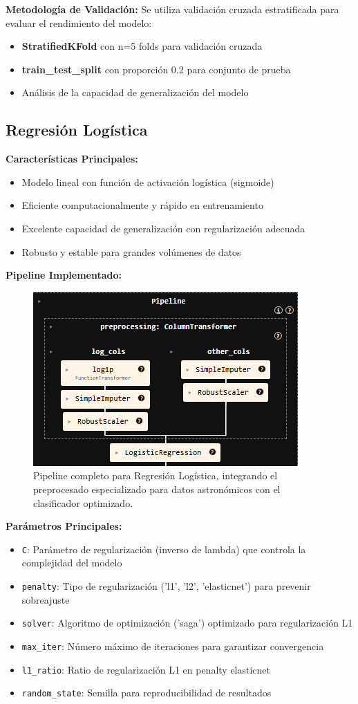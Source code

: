 \documentclass{article}
\begin{document}
\textbf{Metodología de Validación:}
Se utiliza validación cruzada estratificada para evaluar el rendimiento del modelo:
\begin{itemize}
    \item \textbf{StratifiedKFold} con n=5 folds para validación cruzada
    \item \textbf{train\_test\_split} con proporción 0.2 para conjunto de prueba
    \item Análisis de la capacidad de generalización del modelo
\end{itemize}

\subsection{Regresión Logística}

\textbf{Características Principales:}
\begin{itemize}
    \item Modelo lineal con función de activación logística (sigmoide)
    \item Eficiente computacionalmente y rápido en entrenamiento
    \item Excelente capacidad de generalización con regularización adecuada
    \item Robusto y estable para grandes volúmenes de datos
\end{itemize}

\textbf{Pipeline Implementado:}
\begin{figure}[H]
    \centering
    \includegraphics[width=0.4\linewidth]{pipeline_logistic_regression.png}
    \caption{Pipeline completo para Regresión Logística, integrando el preprocesado especializado para datos astronómicos con el clasificador optimizado.}
    \label{fig:pipeline_lr}
\end{figure}

\textbf{Parámetros Principales:}
\begin{itemize}
    \item \texttt{C}: Parámetro de regularización (inverso de lambda) que controla la complejidad del modelo
    \item \texttt{penalty}: Tipo de regularización ('l1', 'l2', 'elasticnet') para prevenir sobreajuste
    \item \texttt{solver}: Algoritmo de optimización ('saga') optimizado para regularización L1
    \item \texttt{max\_iter}: Número máximo de iteraciones para garantizar convergencia
    \item \texttt{l1\_ratio}: Ratio de regularización L1 en penalty elasticnet
    \item \texttt{random\_state}: Semilla para reproducibilidad de resultados
\end{itemize}
\end{document}
